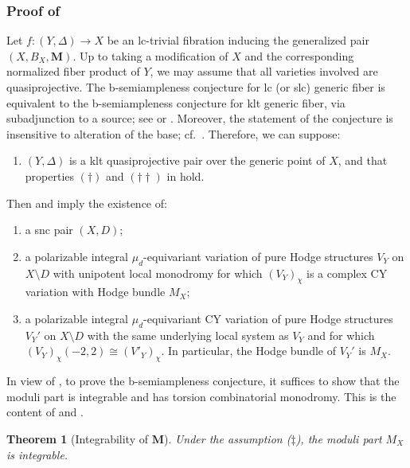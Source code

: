 \documentclass{amsart}
\newtheorem{theorem}{Theorem}[section]
\theoremstyle{definition}
\theoremstyle{remark}
\newcommand\bfM{{\bf M}}
\def\bfM{\mathbf{M}}
\numberwithin{equation}{section}
\begin{document}
\subsubsection{Proof of }
Let $f \colon (Y, \Delta) \to X$ be an lc-trivial fibration inducing the generalized pair $(X, B_X, \bfM)$.
Up to taking a modification of $X$ and the corresponding normalized fiber product of $Y$, we may assume that all varieties involved are quasiprojective.
The b-semiampleness conjecture for lc (or slc) generic fiber is equivalent to the  b-semiampleness conjecture for klt generic fiber, via subadjunction to a source; see \cite[Thm.~1.1]{FG14} or .
Moreover, the statement of the conjecture is insensitive to alteration of the base; cf.~. Therefore, we can suppose:
\begin{enumerate}
 \item[($\ddagger$)] $(Y, \Delta)$ is a klt quasiprojective pair over the generic point of $X$, and that properties $(\dagger)$ and $(\dagger \dagger)$ in  hold.
\end{enumerate}
Then  and  imply the existence of:
\begin{enumerate}
\item a snc pair $(X,D)$; 

\item a polarizable integral $\mu_d$-equivariant variation of pure Hodge structures $V_Y$ on $X \setminus D$ with unipotent local monodromy for which $(V_Y)_\chi$ is a complex CY variation with Hodge bundle $M_X$;
\item a polarizable integral $\mu_d$-equivariant CY variation of pure Hodge structures $V_Y'$ on $X\setminus D$ with the same underlying local system as $V_Y$ and for which $(V_Y)_\chi(-2,2)\cong (V'_Y)_\chi$.  In particular, the Hodge bundle of $V_Y'$ is $M_X$.
\end{enumerate}
In view of , to prove the  b-semiampleness conjecture, it suffices to show that the moduli part is integrable and has torsion combinatorial monodromy.  This is the content of  and .







\begin{theorem}[Integrability of $\bfM$]\label{thm:integrability}
Under the assumption ($\ddagger$), the moduli part $M_X$ is integrable.
\end{theorem}
\end{document}

